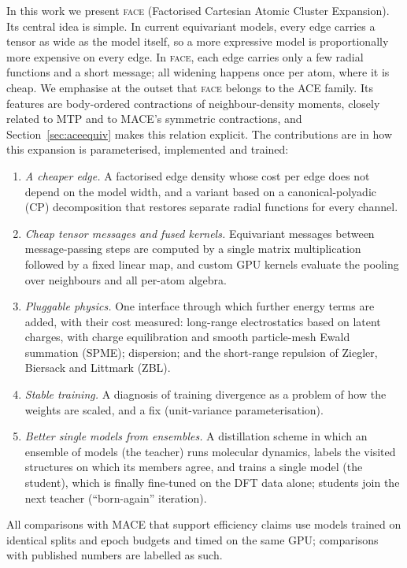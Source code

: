 \documentclass[journal=jctcce,manuscript=article,layout=traditional]{achemso}
\newcommand{\FACE}{\textup{\textsc{face}}}
\begin{document}
In this work we present \FACE{} (Factorised Cartesian Atomic Cluster Expansion). Its central idea is simple. In
current equivariant models, every edge carries a tensor as wide as the model itself, so a more expressive model is
proportionally more expensive on every edge. In \FACE{}, each edge carries only a few radial functions and a short
message; all widening happens once per atom, where it is cheap. We emphasise at the outset that \FACE{} belongs to the
ACE family. Its features are body-ordered contractions of neighbour-density moments, closely
related to MTP and to MACE's symmetric contractions, and Section~\ref{sec:aceequiv} makes this relation explicit.
The contributions are in how this expansion is parameterised, implemented and trained:
\begin{enumerate}
\item \emph{A cheaper edge.} A factorised edge density whose cost per edge does not depend on the model width, and
a variant based on a canonical-polyadic (CP) decomposition that restores separate radial functions for every
channel.
\item \emph{Cheap tensor messages and fused kernels.} Equivariant messages between message-passing steps are
computed by a single matrix multiplication followed by a fixed linear map, and custom GPU kernels evaluate the
pooling over neighbours and all per-atom algebra.
\item \emph{Pluggable physics.} One interface through which further energy terms are added, with their cost
measured: long-range electrostatics based on latent charges, with charge equilibration and smooth particle-mesh
Ewald summation (SPME)\cite{essmann1995spme}; dispersion; and the short-range repulsion of Ziegler, Biersack and
Littmark (ZBL).
\item \emph{Stable training.} A diagnosis of training divergence as a problem of how the weights are scaled, and a
fix (unit-variance parameterisation).
\item \emph{Better single models from ensembles.} A distillation scheme in which an ensemble of models (the
teacher) runs molecular dynamics, labels the visited structures on which its members agree, and trains a single
model (the student), which is finally fine-tuned on the DFT data alone; students join the next teacher
(``born-again'' iteration\cite{furlanello2018}).
\end{enumerate}
All comparisons with MACE that support efficiency claims use models trained on identical splits and epoch budgets
and timed on the same GPU; comparisons with published numbers are labelled as such.
\end{document}
